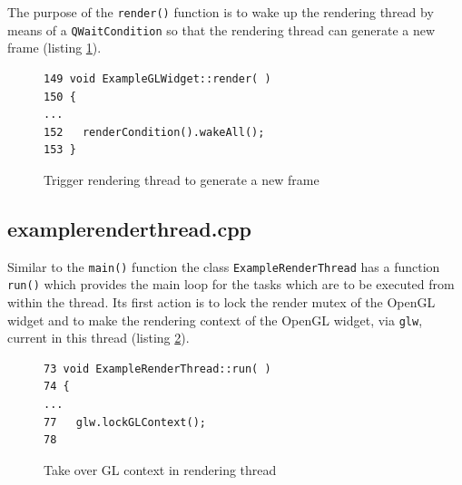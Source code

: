 \documentclass[jou,noapacite]{apa}
\begin{document}
The purpose of the \lstinline|render()| function is to wake up the rendering
thread by means of a \lstinline|QWaitCondition| so that the rendering thread can
generate a new frame (listing \ref{lst:render}).
%
\begin{figure}[h]
\begin{lstlisting}[basicstyle=\scriptsize]
149 void ExampleGLWidget::render( )
150 {
...
152   renderCondition().wakeAll();
153 }
\end{lstlisting}
\caption{Trigger rendering thread to generate a new frame}
\label{lst:render}
\end{figure}

\subsection{examplerenderthread.cpp}

Similar to the \lstinline|main()| function the
class \lstinline|ExampleRenderThread| has a function \lstinline|run()| which
provides the main loop for the tasks which are to be executed from within the
thread.
%
Its first action is to lock the render mutex of the OpenGL widget and to make the
rendering context of the OpenGL widget, via \lstinline|glw|, current in this
thread (listing \ref{lst:run}).
%
\begin{figure}[h]
\begin{lstlisting}[basicstyle=\scriptsize]
73 void ExampleRenderThread::run( )
74 {
...
77   glw.lockGLContext();
78
\end{lstlisting}
\caption{Take over GL context in rendering thread}
\label{lst:run}
\end{figure}
%
\end{document}
